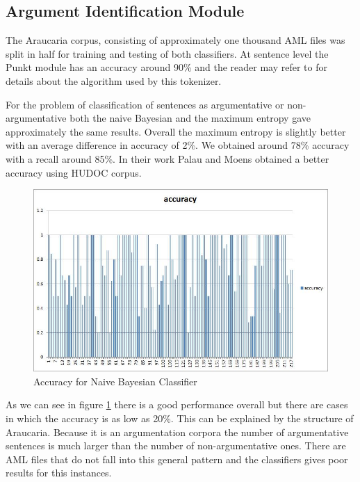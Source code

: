 \subsection{Argument Identification Module}
The Araucaria corpus, consisting of approximately one thousand AML files was split in half for training and testing of both classifiers. At sentence level the Punkt module has an accuracy around 90\% and the reader may refer to \cite{kiss} for details about the algorithm used by this tokenizer.
\par
For the problem of classification of sentences as argumentative or non-argumentative both the naive Bayesian and the maximum entropy gave approximately the same results. Overall the maximum entropy is slightly better with an average difference in accuracy of 2\%. We obtained around 78\% accuracy with a recall around 85\%. In their work \cite{palau1} Palau and Moens obtained a better accuracy using HUDOC corpus.

\begin{figure}[tbh]
\centering
\includegraphics[scale=0.6]{accuracy.jpg}
\caption{Accuracy for Naive Bayesian Classifier}
\label{fig:acc}
\end{figure}

As we can see in figure \ref{fig:acc} there is a good performance overall but there are cases in which the accuracy is as low as 20\%. This can be explained by the structure of Araucaria. Because it is an argumentation corpora the number of argumentative sentences is much larger than the number of non-argumentative ones. There are AML files that do not fall into this general pattern and the classifiers gives poor results for this instances.

